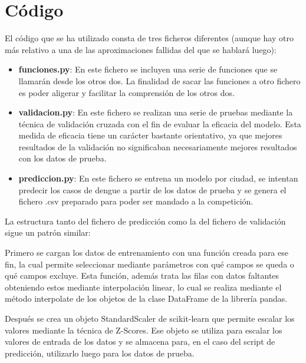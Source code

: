 \documentclass[acmtog, screen]{acmart}
\begin{document}
\section{Código}
El código que se ha utilizado consta de tres ficheros diferentes (aunque hay otro más relativo a una de las aproximaciones fallidas del que se hablará luego):
\begin{itemize}
	\item \textbf{funciones.py}: En este fichero se incluyen una serie de funciones que se llamarán desde los otros dos. La finalidad de sacar las funciones a otro fichero es poder aligerar y facilitar la comprensión de los otros dos.
	\item \textbf{validacion.py}: En este fichero se realizan una serie de pruebas mediante la técnica de validación cruzada con el fin de evaluar la eficacia del modelo. Esta medida de eficacia tiene un carácter bastante orientativo, ya que mejores resultados de la validación no significaban necesariamente mejores resultados con los datos de prueba.
	\item \textbf{prediccion.py}: En este fichero se entrena un modelo por ciudad, se intentan predecir los casos de dengue a partir de los datos de prueba y se genera el fichero .csv preparado para poder ser mandado a la competición.
\end{itemize}
La estructura tanto del fichero de predicción como la del fichero de validación sigue un patrón similar:

Primero se cargan los datos de entrenamiento con una función creada para ese fin, la cual permite seleccionar mediante parámetros con qué campos se queda o qué campos excluye. Esta función, además trata las filas con datos faltantes obteniendo estos mediante interpolación linear, lo cual se realiza mediante el método interpolate de los objetos de la clase DataFrame de la librería pandas.

Después se crea un objeto StandardScaler de scikit-learn que permite escalar los valores mediante la técnica de Z-Scores. Ese objeto se utiliza para escalar los valores de entrada de los datos y se almacena para, en el caso del script de predicción, utilizarlo luego para los datos de prueba.
\end{document}

